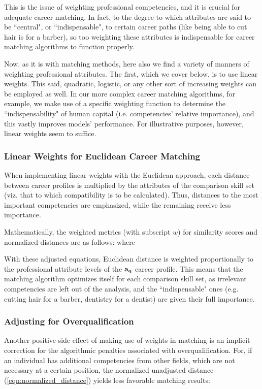 \documentclass{article}
\begin{document}
This is the issue of weighting professional competencies, and it is crucial for
adequate career matching. In fact, to the degree to which attributes are said
to be ``central", or ``indispensable", to certain career paths (like being able
to cut hair is for a barber), so too weighting these attributes is
indispensable for career matching algorithms to function properly.

Now, as it is with matching methods, here also we find a variety of manners of
weighting professional attributes. The first, which we cover below, is to use
linear weights. This said, quadratic, logistic, or any other sort of increasing
weights can be employed as well. In our more complex career matching
algorithms, for example, we make use of a specific weighting function to
determine the ``indispensability" of human capital (i.e. competencies' relative
importance), and this vastly improves models' performance. For illustrative
purposes, however, linear weights seem to suffice.

\subsubsection{Linear Weights for Euclidean Career Matching}
When implementing linear weights with the Euclidean approach, each distance
between career profiles is multiplied by the attributes of the comparison skill
set (viz. that to which compatibility is to be calculated). Thus, distances to
the most important competencies are emphasized, while the remaining receive
less importance.

Mathematically, the weighted metrics (with subscript $w$) for similarity scores
and normalized distances are as follows: \EqnWeightedSimilarity where
\EqnWeightedDistance

With these adjusted equations, Euclidean distance is weighted proportionally to
the professional attribute levels of the $\vb{a_{q}}$ career profile. This
means that the matching algorithm optimizes itself for each comparison skill
set, as irrelevant competencies are left out of the analysis, and the
``indispensable" ones (e.g. cutting hair for a barber, dentistry for a dentist)
are given their full importance.

\subsubsection{Adjusting for Overqualification}
Another positive side effect of making use of weights in matching is an
implicit correction for the algorithmic penalties associated with
overqualification. For, if an individual has additional competencies from other
fields, which are not necessary at a certain position, the normalized
unadjusted distance (\ref{eqn:normalized_distance}) yields less favorable
matching results: \EqnDistanceDerivative
\end{document}
